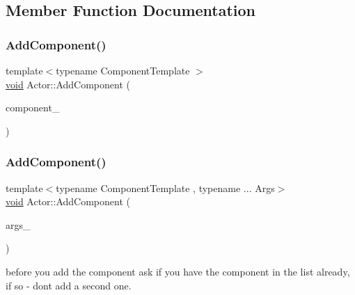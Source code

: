 \subsection{Member Function Documentation}
\mbox{\label{classActor_aa8ff3a6ac0f5a1bc18145be0b0de9475}} 
\subsubsection{\texorpdfstring{Add\+Component()}{AddComponent()}\hspace{0.1cm}{\footnotesize\ttfamily [1/2]}}
{\footnotesize\ttfamily template$<$typename Component\+Template $>$ \\
\hyperlink{imgui__impl__opengl3__loader_8h_ac668e7cffd9e2e9cfee428b9b2f34fa7}{void} Actor\+::\+Add\+Component (\begin{DoxyParamCaption}\item[{\hyperlink{BStateMachine_2Component_8h_add5e90b302c31b74a46619f240214bcc}{Ref}$<$ Component\+Template $>$}]{component\+\_\+ }\end{DoxyParamCaption})\hspace{0.3cm}{\ttfamily [inline]}}

\mbox{\label{classActor_a279bb9d2c8a6e29cc406c1ff5c4bec31}} 
\subsubsection{\texorpdfstring{Add\+Component()}{AddComponent()}\hspace{0.1cm}{\footnotesize\ttfamily [2/2]}}
{\footnotesize\ttfamily template$<$typename Component\+Template , typename ... Args$>$ \\
\hyperlink{imgui__impl__opengl3__loader_8h_ac668e7cffd9e2e9cfee428b9b2f34fa7}{void} Actor\+::\+Add\+Component (\begin{DoxyParamCaption}\item[{Args \&\&...}]{args\+\_\+ }\end{DoxyParamCaption})\hspace{0.3cm}{\ttfamily [inline]}}

before you add the component ask if you have the component in the list already, if so -\/ don\textquotesingle{}t add a second one.

